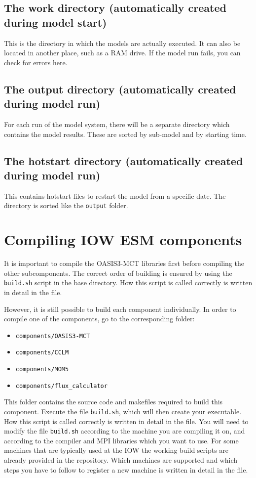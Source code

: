 \documentclass[a4paper,titlepage]{scrartcl}
\begin{document}
\subsection{The work directory (automatically created during model start)}
This is the directory in which the models are actually executed.
It can also be located in another place, such as a RAM drive.
If the model run fails, you can check for errors here.

\subsection{The output directory (automatically created during model run)}
For each run of the model system, there will be a separate directory which contains the model results.
These are sorted by sub-model and by starting time.

\subsection{The hotstart directory (automatically created during model run)}
This contains hotstart files to restart the model from a specific date.
The directory is sorted like the \texttt{output} folder.


\newpage
\section{Compiling IOW ESM components}
It is important to compile the OASIS3-MCT libraries first before compiling the other subcomponents.
The correct order of building is ensured by using the \texttt{build.sh} script in the base directory.
How this script is called correctly is written in detail in the \Readme file.

However, it is still possible to build each component individually.
In order to compile one of the components, go to the corresponding folder:
\begin{itemize}
\item \texttt{components/OASIS3-MCT}
\item \texttt{components/CCLM}
\item \texttt{components/MOM5}
\item \texttt{components/flux\_calculator}
\end{itemize}
This folder contains the source code and makefiles required to build this component.
Execute the file \texttt{build.sh}, which will then create your executable.
How this script is called correctly is written in detail in the \Readme file.
You will need to modify the file \texttt{build.sh} according to the machine you are compiling it on, and according to the compiler and MPI libraries which you want to use.
For some machines that are typically used at the IOW the working build scripts are already provided in the repository.
Which machines are supported and which steps you have to follow to register a new machine is written in detail in the \Readme file.
\end{document}
